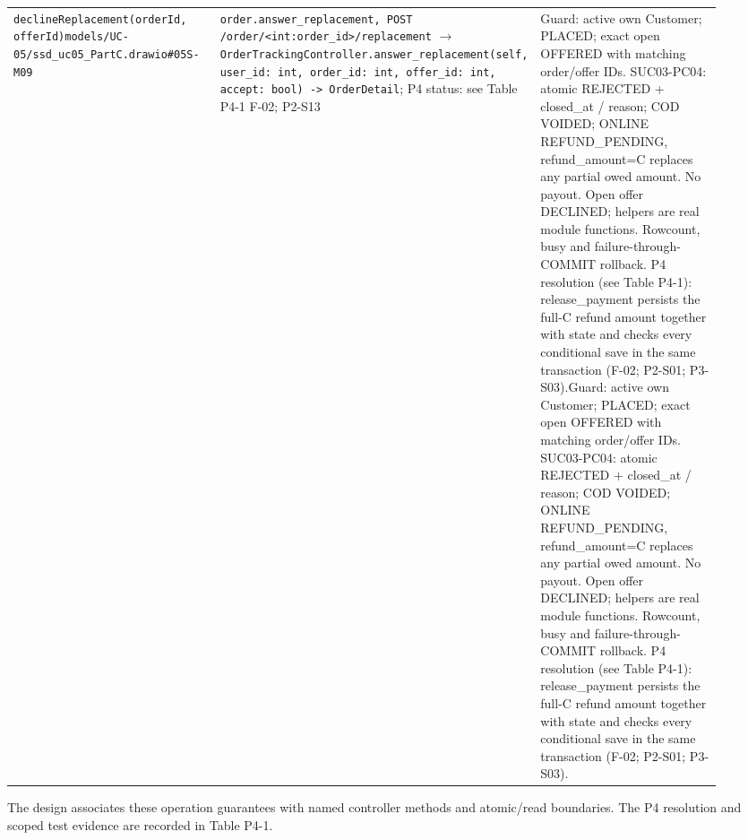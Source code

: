 \begin{longtable}{>{\raggedright\arraybackslash}p{0.3067\linewidth}>{\raggedright\arraybackslash}p{0.3067\linewidth}>{\raggedright\arraybackslash}p{0.3067\linewidth}}
\texttt{declineReplacement(orderId, offerId)}\newline{}\texttt{models/\allowbreak{}UC-05/\allowbreak{}ssd\_\allowbreak{}uc05\_\allowbreak{}PartC.\allowbreak{}drawio\#05S-M09} & \texttt{order.\allowbreak{}answer\_\allowbreak{}replacement, POST /\allowbreak{}order/\allowbreak{}\textless{}int:order\_\allowbreak{}id\textgreater{}/\allowbreak{}replacement} \ensuremath{\rightarrow} \texttt{OrderTrackingController.\allowbreak{}answer\_\allowbreak{}replacement(self, user\_\allowbreak{}id: int, order\_\allowbreak{}id: int, offer\_\allowbreak{}id: int, accept: bool) -\textgreater{} OrderDetail}; P4 status: see Table P4-1 F-02; P2-S13 & Guard: active own Customer; PLACED; exact open OFFERED with matching order/offer IDs. SUC03-PC04: atomic REJECTED + closed\_at / reason; COD VOIDED; ONLINE REFUND\_PENDING, refund\_amount=C replaces any partial owed amount. No payout. Open offer DECLINED; helpers are real module functions. Rowcount, busy and failure-through-COMMIT rollback. P4 resolution (see Table P4-1): release\_payment persists the full-C refund amount together with state and checks every conditional save in the same transaction (F-02; P2-S01; P3-S03).\newline{}Guard: active own Customer; PLACED; exact open OFFERED with matching order/offer IDs. SUC03-PC04: atomic REJECTED + closed\_at / reason; COD VOIDED; ONLINE REFUND\_PENDING, refund\_amount=C replaces any partial owed amount. No payout. Open offer DECLINED; helpers are real module functions. Rowcount, busy and failure-through-COMMIT rollback. P4 resolution (see Table P4-1): release\_payment persists the full-C refund amount together with state and checks every conditional save in the same transaction (F-02; P2-S01; P3-S03). \\
\end{longtable}
The design associates these operation guarantees with named controller methods and atomic/read boundaries. The P4 resolution and scoped test evidence are recorded in Table P4-1.

